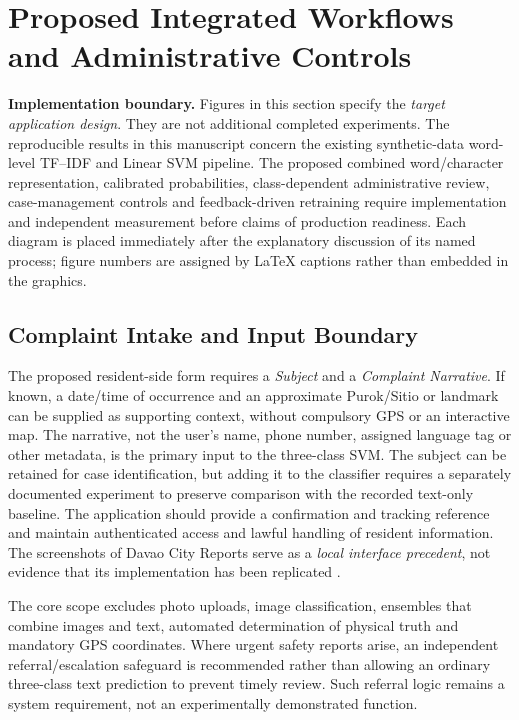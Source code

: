 \section{Proposed Integrated Workflows and Administrative Controls}
\label{sec:proposed-operational-workflows}
\textbf{Implementation boundary.} Figures in this section specify the \emph{target application design}. They are not additional completed experiments. The reproducible results in this manuscript concern the existing synthetic-data word-level TF--IDF and Linear SVM pipeline. The proposed combined word/character representation, calibrated probabilities, class-dependent administrative review, case-management controls and feedback-driven retraining require implementation and independent measurement before claims of production readiness. Each diagram is placed immediately after the explanatory discussion of its named process; figure numbers are assigned by LaTeX captions rather than embedded in the graphics.

\subsection{Complaint Intake and Input Boundary}
The proposed resident-side form requires a \emph{Subject} and a \emph{Complaint Narrative}. If known, a date/time of occurrence and an approximate Purok/Sitio or landmark can be supplied as supporting context, without compulsory GPS or an interactive map. The narrative, not the user's name, phone number, assigned language tag or other metadata, is the primary input to the three-class SVM. The subject can be retained for case identification, but adding it to the classifier requires a separately documented experiment to preserve comparison with the recorded text-only baseline. The application should provide a confirmation and tracking reference and maintain authenticated access and lawful handling of resident information. The screenshots of Davao City Reports serve as a \emph{local interface precedent}, not evidence that its implementation has been replicated \cite{dcr,ra10173}.

The core scope excludes photo uploads, image classification, ensembles that combine images and text, automated determination of physical truth and mandatory GPS coordinates. Where urgent safety reports arise, an independent referral/escalation safeguard is recommended rather than allowing an ordinary three-class text prediction to prevent timely review. Such referral logic remains a system requirement, not an experimentally demonstrated function.


